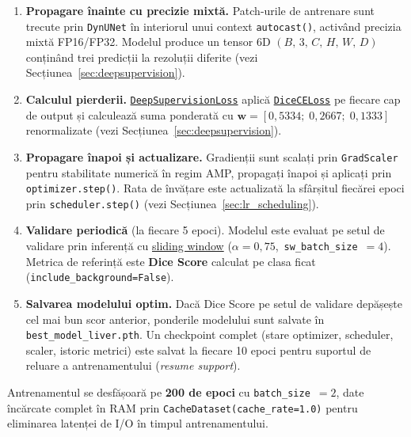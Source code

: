 \documentclass[12pt, a4paper]{report}
\begin{document}
\begin{enumerate}
    \item \textbf{Propagare înainte cu precizie mixtă.}
    Patch-urile de antrenare sunt trecute prin \texttt{DynUNet}
    în interiorul unui context \texttt{autocast()}, activând
    precizia mixtă FP16/FP32. Modelul produce un tensor 6D
    $(B,\, 3,\, C,\, H,\, W,\, D)$ conținând trei predicții
    la rezoluții diferite
    (vezi Secțiunea~\ref{sec:deepsupervision}).

    \item \textbf{Calculul pierderii.}
    \hyperref[sec:deepsupervision]{\texttt{DeepSupervisionLoss}}
    aplică \hyperref[sec:diceceloss]{\texttt{DiceCELoss}} pe
    fiecare cap de output și calculează suma ponderată cu
    $\mathbf{w} = [0{,}5334;\; 0{,}2667;\; 0{,}1333]$
    renormalizate (vezi Secțiunea~\ref{sec:deepsupervision}).

    \item \textbf{Propagare înapoi și actualizare.}
    Gradienții sunt scalați prin \texttt{GradScaler} pentru
    stabilitate numerică în regim AMP, propagați înapoi și
    aplicați prin \texttt{optimizer.step()}. Rata de învățare
    este actualizată la sfârșitul fiecărei epoci prin
    \texttt{scheduler.step()}
    (vezi Secțiunea~\ref{sec:lr_scheduling}).

    \item \textbf{Validare periodică} (la fiecare 5 epoci).
    Modelul este evaluat pe setul de validare prin inferență cu
    \hyperref[sec:overlap]{sliding window}
    ($\alpha = 0{,}75$,\ \texttt{sw\_batch\_size}~$= 4$).
    Metrica de referință este \textbf{Dice Score} calculat
    pe clasa ficat (\texttt{include\_background=False}).

    \item \textbf{Salvarea modelului optim.}
    Dacă Dice Score pe setul de validare depășește cel mai bun
    scor anterior, ponderile modelului sunt salvate în
    \texttt{best\_model\_liver.pth}. Un checkpoint complet
    (stare optimizer, scheduler, scaler, istoric metrici) este
    salvat la fiecare 10 epoci pentru suportul de reluare a
    antrenamentului (\textit{resume support}).
\end{enumerate}

Antrenamentul se desfășoară pe \textbf{200 de epoci} cu
\texttt{batch\_size}~$= 2$, date încărcate complet în RAM prin
\texttt{CacheDataset(cache\_rate=1.0)} pentru eliminarea
latenței de I/O în timpul antrenamentului.
\end{document}
